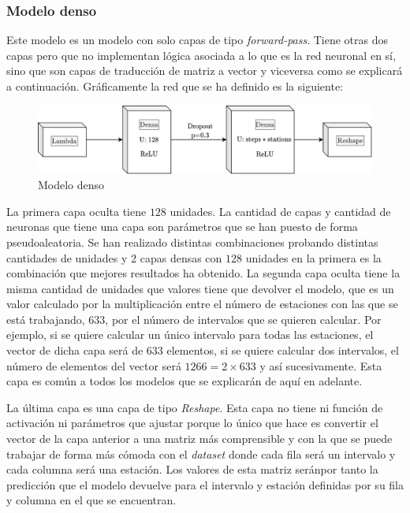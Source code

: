 \subsubsection{Modelo denso}


Este modelo es un modelo con solo capas de tipo \textit{forward-pass}. Tiene otras dos capas pero que no implementan lógica asociada a lo que es la red neuronal en sí, sino que son capas de traducción de matriz a vector y viceversa como se explicará a continuación. Gráficamente la red que se ha definido es la siguiente:
\begin{figure}[H]
    \centering
    \includegraphics[width=12cm]{images/solution/models/dense.png}
    \caption{Modelo denso}
    \label{fig:dense-model}
\end{figure}

La primera capa oculta tiene $128$ unidades. La cantidad de capas y cantidad de neuronas que tiene una capa son parámetros que se han puesto de forma pseudoaleatoria. Se han realizado distintas combinaciones probando distintas cantidades de unidades y 2 capas densas con $128$ unidades en la primera es la combinación que mejores resultados ha obtenido. La segunda capa oculta tiene la misma cantidad de unidades que valores tiene que devolver el modelo, que es un valor calculado por la multiplicación entre el número de estaciones con las que se está trabajando, $633$, por el número de intervalos que se quieren calcular. Por ejemplo, si se quiere calcular un único intervalo para todas las estaciones, el vector de dicha capa será de $633$ elementos, si se quiere calcular dos intervalos, el número de elementos del vector será $1266 = 2 \times 633$ y así sucesivamente. Esta capa es común a todos los modelos que se explicarán de aquí en adelante.
\newline

La última capa es una capa de tipo \textit{Reshape}. Esta capa no tiene ni función de activación ni parámetros que ajustar porque lo único que hace es convertir el vector de la capa anterior a una matriz más comprensible y con la que se puede trabajar de forma más cómoda con el \textit{dataset} donde cada fila será un intervalo y cada columna será una estación. Los valores de esta matriz seránpor tanto la predicción que el modelo devuelve para el intervalo y estación definidas por su fila y columna en el que se encuentran.
\newline

